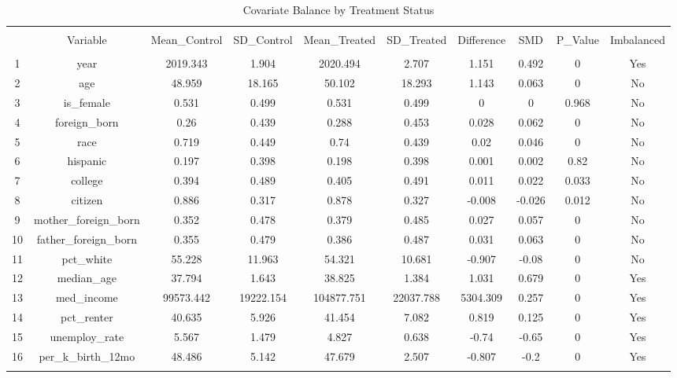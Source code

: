 
\begin{table}[!htbp] \centering 
  \caption{Covariate Balance by Treatment Status} 
  \label{} 
\begin{tabular}{@{\extracolsep{5pt}} cccccccccc} 
\\[-1.8ex]\hline 
\hline \\[-1.8ex] 
 & Variable & Mean\_Control & SD\_Control & Mean\_Treated & SD\_Treated & Difference & SMD & P\_Value & Imbalanced \\ 
\hline \\[-1.8ex] 
1 & year & 2019.343 & 1.904 & 2020.494 & 2.707 & 1.151 & 0.492 & 0 & Yes \\ 
2 & age & 48.959 & 18.165 & 50.102 & 18.293 & 1.143 & 0.063 & 0 & No \\ 
3 & is\_female & 0.531 & 0.499 & 0.531 & 0.499 & 0 & 0 & 0.968 & No \\ 
4 & foreign\_born & 0.26 & 0.439 & 0.288 & 0.453 & 0.028 & 0.062 & 0 & No \\ 
5 & race & 0.719 & 0.449 & 0.74 & 0.439 & 0.02 & 0.046 & 0 & No \\ 
6 & hispanic & 0.197 & 0.398 & 0.198 & 0.398 & 0.001 & 0.002 & 0.82 & No \\ 
7 & college & 0.394 & 0.489 & 0.405 & 0.491 & 0.011 & 0.022 & 0.033 & No \\ 
8 & citizen & 0.886 & 0.317 & 0.878 & 0.327 & -0.008 & -0.026 & 0.012 & No \\ 
9 & mother\_foreign\_born & 0.352 & 0.478 & 0.379 & 0.485 & 0.027 & 0.057 & 0 & No \\ 
10 & father\_foreign\_born & 0.355 & 0.479 & 0.386 & 0.487 & 0.031 & 0.063 & 0 & No \\ 
11 & pct\_white & 55.228 & 11.963 & 54.321 & 10.681 & -0.907 & -0.08 & 0 & No \\ 
12 & median\_age & 37.794 & 1.643 & 38.825 & 1.384 & 1.031 & 0.679 & 0 & Yes \\ 
13 & med\_income & 99573.442 & 19222.154 & 104877.751 & 22037.788 & 5304.309 & 0.257 & 0 & Yes \\ 
14 & pct\_renter & 40.635 & 5.926 & 41.454 & 7.082 & 0.819 & 0.125 & 0 & Yes \\ 
15 & unemploy\_rate & 5.567 & 1.479 & 4.827 & 0.638 & -0.74 & -0.65 & 0 & Yes \\ 
16 & per\_k\_birth\_12mo & 48.486 & 5.142 & 47.679 & 2.507 & -0.807 & -0.2 & 0 & Yes \\ 
\hline \\[-1.8ex] 
\end{tabular} 
\end{table} 
